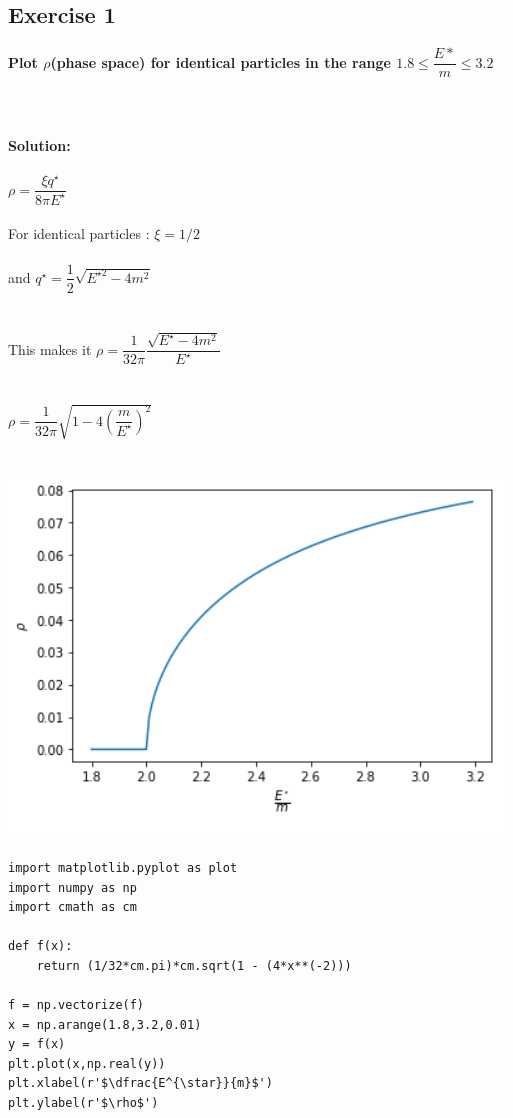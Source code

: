 \documentclass[a4paper]{article}
\begin{document}
\subsection{ Exercise 1}
\textbf{Plot $\rho$(phase space) for identical particles in the range $1.8 \leq \dfrac{E*}{m} \leq 3.2$}
\\ \\ \\ \\
\textbf{Solution:}\\
\\
$\rho = \dfrac{\xi q^{\star}}{8 \pi E^{\star}}$ 
\\
\\
For identical particles : $\xi = 1/2$ 
\\
\\
and $q^{\star}=\dfrac{1}{2}\sqrt{E^{\star 2} - 4m^2}$
\\
\\
\\
This makes it $\rho = \dfrac{1}{32 \pi} \dfrac{\sqrt{ E^{\star} - 4m^2 }}{ E^{\star}}$
\\
\\
\\
$\rho = \dfrac{1}{32 \pi} \sqrt{1 - 4(\dfrac{m}{E^{\star}})^2}$
\\
\\
\\
\includegraphics{ex1.png}

\begin{lstlisting}[label=code-used,caption=Code used]
import matplotlib.pyplot as plot
import numpy as np 
import cmath as cm 

def f(x):
    return (1/32*cm.pi)*cm.sqrt(1 - (4*x**(-2)))

f = np.vectorize(f)
x = np.arange(1.8,3.2,0.01)
y = f(x)
plt.plot(x,np.real(y))
plt.xlabel(r'$\dfrac{E^{\star}}{m}$')
plt.ylabel(r'$\rho$')
\end{lstlisting}
\end{document}
